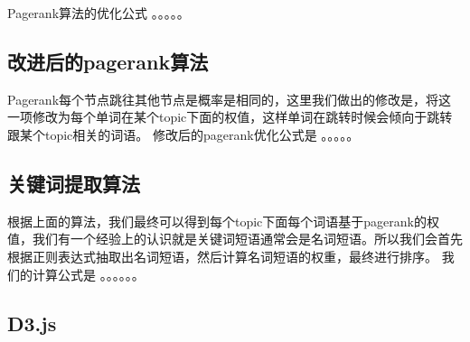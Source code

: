 \documentclass[master]{njuthesis}
\begin{document}
Pagerank算法的优化公式
。。。。。

\subsection{改进后的pagerank算法}

Pagerank每个节点跳往其他节点是概率是相同的，这里我们做出的修改是，将这一项修改为每个单词在某个topic下面的权值，这样单词在跳转时候会倾向于跳转跟某个topic相关的词语。
修改后的pagerank优化公式是
。。。。。

\subsection{关键词提取算法}

根据上面的算法，我们最终可以得到每个topic下面每个词语基于pagerank的权值，我们有一个经验上的认识就是关键词短语通常会是名词短语。所以我们会首先根据正则表达式抽取出名词短语，然后计算名词短语的权重，最终进行排序。
我们的计算公式是
。。。。。。

\subsection{D3.js}
\end{document}
